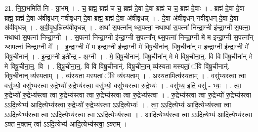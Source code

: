 \documentclass[17pt]{extarticle}
\begin{document}
21. नि॒ग्रा॒भमिति॑ नि - ग्रा॒भम् । . च॒ ब्रह्म॒ ब्रह्म॑ च च॒ ब्रह्म॑ दे॒वा दे॒वा ब्रह्म॑ च च॒ ब्रह्म॑ दे॒वाः । . ब्रह्म॑ दे॒वा दे॒वा ब्रह्म॒ ब्रह्म॑ दे॒वा अ॑वीवृधन् नवीवृधन् दे॒वा ब्रह्म॒ ब्रह्म॑ दे॒वा अ॑वीवृधन्न् । . दे॒वा अ॑वीवृधन् नवीवृधन् दे॒वा दे॒वा अ॑वीवृधन्न् । . अ॒वी॒वृ॒ध॒न्नित्य॑वीवृधन्न् । . अथा॑ स॒पत्ना᳚न् थ्स॒पत्ना॒ नथाथा॑ स॒पत्ना॑ निन्द्रा॒ग्नी इ॑न्द्रा॒ग्नी स॒पत्ना॒ नथाथा॑ स॒पत्ना॑ निन्द्रा॒ग्नी । . स॒पत्ना॑ निन्द्रा॒ग्नी इ॑न्द्रा॒ग्नी स॒पत्ना᳚न् थ्स॒पत्ना॑ निन्द्रा॒ग्नी मे॑ म इन्द्रा॒ग्नी स॒पत्ना᳚न् थ्स॒पत्ना॑ निन्द्रा॒ग्नी मे᳚ । . इ॒न्द्रा॒ग्नी मे॑ म इन्द्रा॒ग्नी इ॑न्द्रा॒ग्नी मे॑ विषू॒चीना॑न्. विषू॒चीना᳚न् म इन्द्रा॒ग्नी इ॑न्द्रा॒ग्नी मे॑ विषू॒चीनान्॑ । . इ॒न्द्रा॒ग्नी इती᳚न्द्र - अ॒ग्नी । . मे॒ वि॒षू॒चीनान्॑. विषू॒चीना᳚न् मे मे विषू॒चीना॒न्॒. वि वि वि॑षू॒चीना᳚न् मे मे विषू॒चीना॒न्॒. वि । . वि॒षू॒चीना॒न्॒. वि वि वि॑षू॒चीनान्॑. विषू॒चीना॒न् व्य॑स्यता मस्यतां॒ ॅवि वि॑षू॒चीनान्॑. विषू॒चीना॒न् व्य॑स्यताम् । . व्य॑स्यता मस्यतां॒ ॅवि व्य॑स्यताम् । . अ॒स्य॒ता॒मित्य॑स्यताम् । . वसु॑भ्यस्त्वा त्वा॒ वसु॑भ्यो॒ वसु॑भ्यस्त्वा रु॒द्रेभ्यो॑ रु॒द्रेभ्य॑स्त्वा॒ वसु॑भ्यो॒ वसु॑भ्यस्त्वा रु॒द्रेभ्यः॑ । . वसु॑भ्य॒ इति॒ वसु॑ - भ्यः॒ । . त्वा॒ रु॒द्रेभ्यो॑ रु॒द्रेभ्य॑स्त्वा त्वा रु॒द्रेभ्य॑स्त्वा त्वा रु॒द्रेभ्य॑स्त्वा त्वा रु॒द्रेभ्य॑स्त्वा । . रु॒द्रेभ्य॑स्त्वा त्वा रु॒द्रेभ्यो॑ रु॒द्रेभ्य॑स्त्वा ऽऽदि॒त्येभ्य॑ आदि॒त्येभ्य॑स्त्वा रु॒द्रेभ्यो॑ रु॒द्रेभ्य॑स्त्वा ऽऽदि॒त्येभ्यः॑ । . त्वा॒ ऽऽदि॒त्येभ्य॑ आदि॒त्येभ्य॑स्त्वा त्वा ऽऽदि॒त्येभ्य॑स्त्वा त्वा ऽऽदि॒त्येभ्य॑स्त्वा त्वा ऽऽदि॒त्येभ्य॑स्त्वा । . आ॒दि॒त्येभ्य॑स्त्वा त्वा ऽऽदि॒त्येभ्य॑ आदि॒त्येभ्य॑स्त्वा॒ ऽक्त म॒क्तम् त्वा॑ ऽऽदि॒त्येभ्य॑ आदि॒त्येभ्य॑स्त्वा॒ ऽक्तम् । \newline
\end{document}
